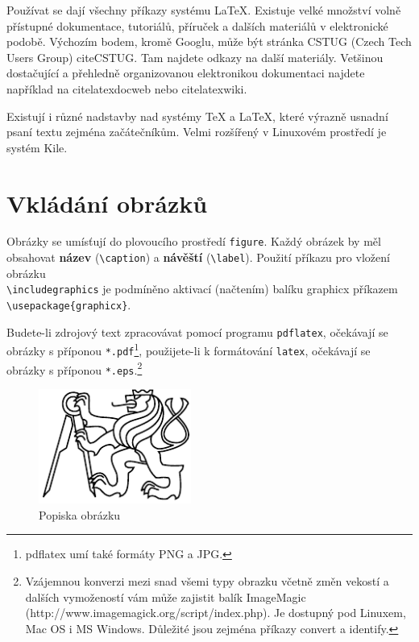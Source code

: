 \documentclass[11pt,twoside,a4paper]{book}
\begin{document}
Používat se dají všechny příkazy systému \LaTeX. Existuje velké množství volně přístupné dokumentace, tutoriálů, příruček a dalších materiálů v elektronické podobě. Výchozím bodem, kromě Googlu, může být stránka CSTUG (Czech Tech Users Group) cite{CSTUG}. Tam najdete odkazy na další materiály.  Vetšinou dostačující a přehledně organizovanou elektronikou dokumentaci najdete například na cite{latexdocweb} nebo cite{latexwiki}.

Existují i různé nadstavby nad systémy \TeX{} a \LaTeX, které výrazně usnadní psaní textu zejména začátečníkům. Velmi rozšířený v Linuxovém prostředí je systém Kile.


\section{Vkládání obrázků}
Obrázky se umísťují do plovoucího prostředí \verb|figure|. Každý obrázek by měl obsahovat \textbf{název} (\verb|\caption|) a \textbf{návěští} (\verb|\label|). Použití příkazu pro vložení obrázku \\\verb|\includegraphics| je podmíněno aktivací (načtením) balíku graphicx příkazem\\ \verb|\usepackage{graphicx}|.

Budete-li zdrojový text zpracovávat pomocí programu \verb|pdflatex|, očekávají se obrázky s příponou \verb|*.pdf|\footnote{pdflatex umí také formáty PNG a JPG.}, použijete-li k formátování \verb|latex|, očekávají se obrázky s příponou \verb|*.eps|.\footnote{Vzájemnou konverzi mezi snad všemi typy obrazku včetně změn vekostí a dalších vymožeností vám může zajistit balík ImageMagic  (http://www.imagemagick.org/script/index.php). Je dostupný pod Linuxem, Mac OS i MS Windows. Důležité jsou zejména příkazy convert a identify.}

\begin{figure}[ht]
\begin{center}
\includegraphics[width=5cm]{figures/LogoCVUT}
\caption{Popiska obrázku}
\label{fig:logo}
\end{center}
\end{figure}
\end{document}
